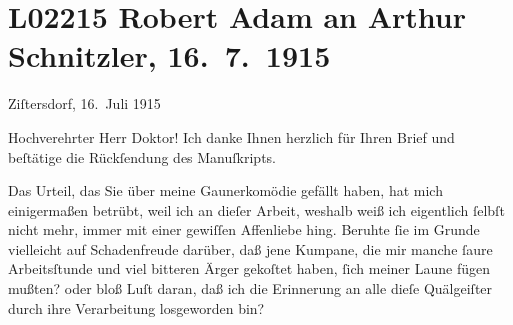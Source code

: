 

\section[Robert Adam an Arthur Schnitzler, 16. 7. 1915]{L02215 Robert Adam an Arthur Schnitzler, 16. 7. 1915}
\nopagebreak{}
\rehead{ }\normalsize\beginnumbering{}
\toendnotes[C]{\smallbreak\pagebreak[2]}
\toendnotes[C]{\smallbreak}
\pstart
           \raggedleft{}{\pb}Ziſtersdorf, 16. Juli 1915\pend
           
\pstart{}Hochverehrter Herr Doktor!\pend\vspace{0.5em}
\pstart
           Ich danke Ihnen herzlich für Ihren Brief und beſtätige die Rückſendung des Manuſkripts.\pend
           
\pstart
           Das Urteil, das Sie über meine Gaunerkomödie gefällt haben, hat mich einigermaßen betrübt, weil ich an
               dieſer Arbeit, weshalb weiß ich eigentlich ſelbſt nicht mehr, immer mit einer
               gewiſſen Affenliebe hing. Beruhte ſie im Grunde vielleicht auf Schadenfreude darüber,
               daß jene Kumpane, die mir manche ſaure Arbeitsſtunde und viel bitteren Ärger gekoſtet
               haben, ſich meiner Laune fügen mußten? oder bloß \label{T_L02215-1v}\label{T_L02215-1} Luſt daran, daß ich die Erinnerung an alle dieſe
               Quälgeiſter durch ihre Verarbeitung losgeworden bin?\pend
           
